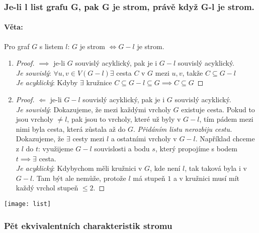 \documentclass[10pt,a4paper]{article}
\begin{document}
\subsubsection{Je-li l list grafu G, pak G je strom, právě když G-l je strom.}
\paragraph*{Věta: } Pro graf $G$ s listem $l$: $G$ je strom $\iff G-l$ je strom.

\begin{enumerate}
    \item \begin{proof} $\implies$ je-li $G$ souvislý acyklický, pak je i $G-l$ souvislý acyklický.\\
        \textit{Je souvislý}: $\forall u,v \in V(G-l) \exists$ cesta $C$ v $G$ mezi $u,v$, takže $C \subseteq G-l$\\ 
        \textit{Je acyklický}: Kdyby $\exists$ kružnice $C\subseteq G-l \subseteq G \implies C\subseteq G$
        \end{proof}
    \item \begin{proof} $\Longleftarrow$ je-li $G-l$ souvislý acyklický, pak je i $G$ souvislý acyklický.\\
        \textit{Je souvislý}: Dokazujeme, že mezi každými vrcholy $G$ existuje cesta. Pokud to jsou vrcholy $\neq l$, pak jsou to vrcholy, které už byly v $G-l$, tím pádem mezi nimi byla cesta, která zůstala až do $G$. \textit{Přidáním listu nerozbiju cestu.} Dokazujeme, že $\exists$ cesty mezi $l$ a ostatními vrcholy v $G-l$. Například chceme z $l$ do $t$: využijeme $G-l$ souvislosti a bodu $s$, který propojíme s bodem $t \implies \exists$ cesta. \\ 
        \textit{Je acyklický}: Kdybychom měli kružnici v $G$, kde není $l$, tak taková byla i v $G-l$. Tam být ale nemůže, protože $l$ má stupeň $1$ a v kružnici musí mít každý vrchol stupeň $\leq 2$. 
        \end{proof}
\end{enumerate}
\begin{center}
    \texttt{[image: list]}
\end{center}

\subsubsection{Pět ekvivalentních charakteristik stromu}
\end{document}
